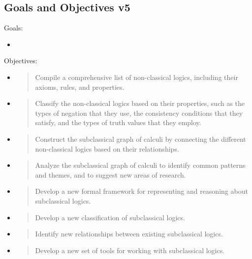 \hypertarget{goals-and-objectives-v5}{%
\subsection{Goals and Objectives v5}\label{goals-and-objectives-v5}}

Goals:

\begin{itemize}
\tightlist
\item
\end{itemize}

Objectives:

\begin{itemize}
\item
  \begin{quote}
  Compile a comprehensive list of non-classical logics, including their
  axioms, rules, and properties.
  \end{quote}
\item
  \begin{quote}
  Classify the non-classical logics based on their properties, such as
  the types of negation that they use, the consistency conditions that
  they satisfy, and the types of truth values that they employ.
  \end{quote}
\item
  \begin{quote}
  Construct the subclassical graph of calculi by connecting the
  different non-classical logics based on their relationships.
  \end{quote}
\item
  \begin{quote}
  Analyze the subclassical graph of calculi to identify common patterns
  and themes, and to suggest new areas of research.
  \end{quote}
\item
  \begin{quote}
  Develop a new formal framework for representing and reasoning about
  subclassical logics.
  \end{quote}
\item
  \begin{quote}
  Develop a new classification of subclassical logics.
  \end{quote}
\item
  \begin{quote}
  Identify new relationships between existing subclassical logics.
  \end{quote}
\item
  \begin{quote}
  Develop a new set of tools for working with subclassical logics.
  \end{quote}
\end{itemize}


